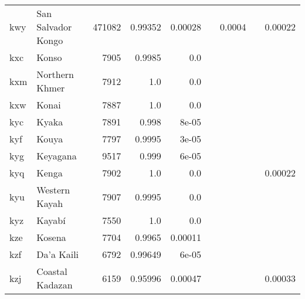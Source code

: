 \documentclass[11pt]{article}
\begin{document}
\begin{table*}[h]
{\begin{tabular}{llrrrrrrr}
kwy         & San Salvador Kongo         & 471082         & 0.99352         & 0.00028         &          & 0.0004         &          & 0.00022         \\

kxc         & Konso         & 7905         & 0.9985         & 0.0         &          &          &          &          \\

kxm         & Northern Khmer         & 7912         & 1.0         & 0.0         &          &          &          &          \\

kxw         & Konai         & 7887         & 1.0         & 0.0         &          &          &          &          \\

kyc         & Kyaka         & 7891         & 0.998         & 8e-05         &          &          &          &          \\

kyf         & Kouya         & 7797         & 0.9995         & 3e-05         &          &          &          &          \\

kyg         & Keyagana         & 9517         & 0.999         & 6e-05         &          &          &          &          \\

kyq         & Kenga         & 7902         & 1.0         & 0.0         &          &          &          & 0.00022         \\

kyu         & Western Kayah         & 7907         & 0.9995         & 0.0         &          &          &          &          \\

kyz         & Kayabí         & 7550         & 1.0         & 0.0         &          &          &          &          \\

kze         & Kosena         & 7704         & 0.9965         & 0.00011         &          &          &          &          \\

kzf         & Da'a Kaili         & 6792         & 0.99649         & 6e-05         &          &          &          &          \\

kzj         & Coastal Kadazan         & 6159         & 0.95996         & 0.00047         &          &          &          & 0.00033         \\


\end{tabular}}
\end{table*}
\end{document}
